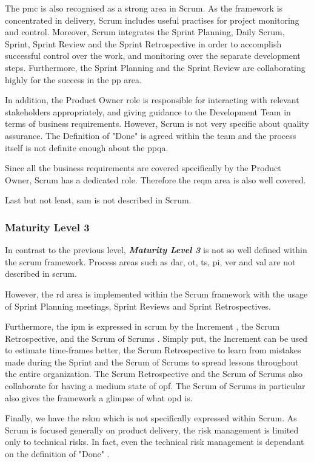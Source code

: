 The \ac{pmc} is also recognised as a strong area in Scrum. As the framework is concentrated in delivery, Scrum includes useful practises for project monitoring and control. Moreover, Scrum integrates the Sprint Planning, Daily Scrum, Sprint, Sprint Review and the Sprint Retrospective in order to accomplish successful control over the work, and monitoring over the separate development steps. Furthermore, the Sprint Planning and the Sprint Review are collaborating highly for the success in the \ac{pp} area. 

In addition, the Product Owner role is responsible for interacting with relevant stakeholders appropriately, and giving guidance to the Development Team in terms of business requirements. However, Scrum is not very specific about quality assurance. The Definition of "Done" is agreed within the team and the process itself is not definite enough about the \ac{ppqa}. 

Since all the business requirements are covered specifically by the Product Owner, Scrum has a dedicated role. Therefore the \ac{reqm} area is also well covered. 

Last but not least, \ac{sam} is not described in Scrum.

\subsubsection{Maturity Level 3}
In contrast to the previous level, \textbf{\textit{Maturity Level 3}} is not so well defined within the \ac{scrum} framework. Process areas such as \ac{dar}, \ac{ot}, \ac{ts}, \ac{pi}, \ac{ver} and \ac{val} are not described in \ac{scrum}.

However, the \ac{rd} area is implemented within the Scrum framework with the usage of Sprint Planning meetings, Sprint Reviews and Sprint Retrospectives.

Furthermore, the \ac{ipm} is expressed in \ac{scrum} by the Increment \citep{schwaber2011scrum}, the Scrum Retrospective, and the Scrum of Scrums \citep{sutherland2001inventing}. Simply put, the Increment can be used to estimate time-frames better, the Scrum Retrospective to learn from mistakes made during the Sprint and the Scrum of Scrums to spread lessons throughout the entire organization. The Scrum Retrospective and the Scrum of Scrums also collaborate for having a medium state of \ac{opf}. The Scrum of Scrums in particular also gives the framework a glimpse of what \ac{opd} is.

Finally, we have the \ac{rskm} which is not specifically expressed within Scrum. As Scrum is focused generally on product delivery, the risk management is limited only to technical risks. In fact, even the technical risk management is dependant on the definition of "Done" \citep{schwaber2011scrum}.


